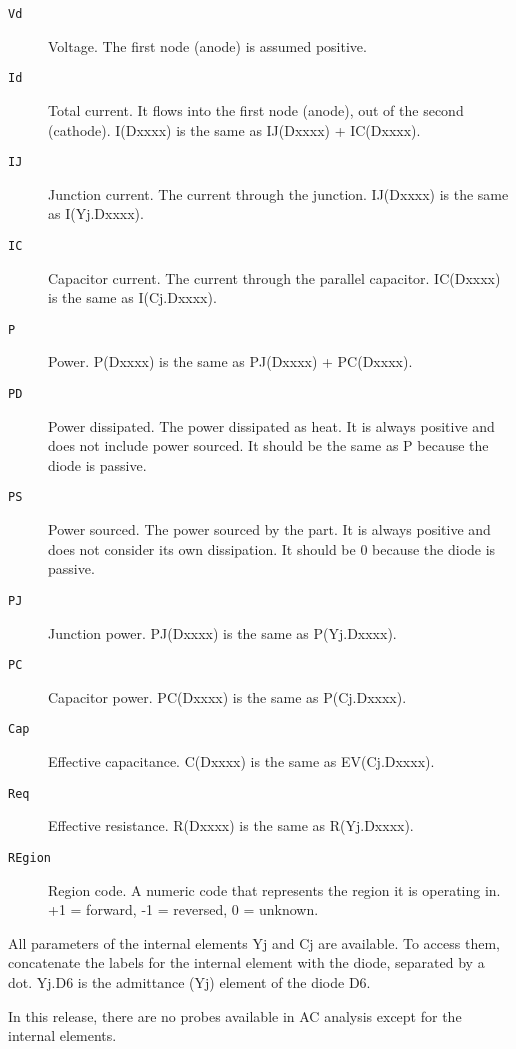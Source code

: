 \begin{description}

\item[{\tt Vd}] Voltage.  The first node (anode) is assumed positive.

\item[{\tt Id}] Total current.  It flows into the first node (anode), out of
the second (cathode).  I(Dxxxx) is the same as IJ(Dxxxx) + IC(Dxxxx).

\item[{\tt IJ}] Junction current.  The current through the junction.  
IJ(Dxxxx) is the same as I(Yj.Dxxxx).

\item[{\tt IC}] Capacitor current.  The current through the parallel 
capacitor.  IC(Dxxxx) is the same as I(Cj.Dxxxx).

\item[{\tt P}] Power.  P(Dxxxx) is the same as PJ(Dxxxx) + PC(Dxxxx).

\item[{\tt PD}] Power dissipated.  The power dissipated as heat.  
It is always positive and does not include power sourced.
It should be the same as P because the diode is passive.

\item[{\tt PS}] Power sourced.  The power sourced by the part.  
It is always positive and does not consider its own dissipation.
It should be 0 because the diode is passive.

\item[{\tt PJ}] Junction power.  PJ(Dxxxx) is the same as P(Yj.Dxxxx).

\item[{\tt PC}] Capacitor power.  PC(Dxxxx) is the same as P(Cj.Dxxxx).

\item[{\tt Cap}] Effective capacitance.  C(Dxxxx) is the same as EV(Cj.Dxxxx).

\item[{\tt Req}] Effective resistance.  R(Dxxxx) is the same as R(Yj.Dxxxx).

\item[{\tt REgion}] Region code.  A numeric code that represents the region
it is operating in.  +1 = forward, -1 = reversed, 0 = unknown.

\end{description}

All parameters of the internal elements Yj and Cj are available.  To access
them, concatenate the labels for the internal element with the diode,
separated by a dot.  Yj.D6 is the admittance (Yj) element of the diode D6.

In this release, there are no probes available in AC analysis except for the
internal elements.
